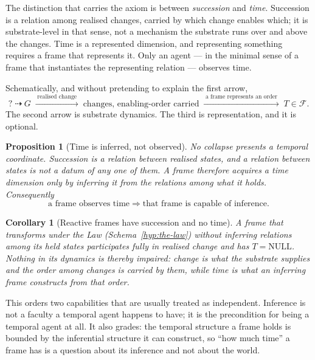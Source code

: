 \documentclass[11pt,a4paper]{article}
\newtheorem{proposition}[definition]{Proposition}
\newtheorem{corollary}[definition]{Corollary}
\theoremstyle{remark}\newtheorem{remark}[definition]{Remark}
\begin{document}
The distinction that carries the axiom is between \emph{succession} and \emph{time}. Succession is a relation among realised changes, carried by which change enables which; it is substrate-level in that sense, not a mechanism the substrate runs over and above the changes. Time is a represented dimension, and representing something requires a frame that represents it. Only an agent --- in the minimal sense of a frame that instantiates the representing relation --- observes time.

Schematically, and without pretending to explain the first arrow,
\[
?\;\dashrightarrow\;G
\;\xrightarrow{\;\text{realised change}\;}\;
\text{changes, enabling-order carried}
\;\xrightarrow{\;\text{a frame represents an order}\;}\;
T\in\mathcal F .
\]
The second arrow is substrate dynamics. The third is representation, and it is optional.

\begin{proposition}[Time is inferred, not observed]\label{prop:time-inferred}
No collapse presents a temporal coordinate. Succession is a relation \emph{between} realised states, and a relation between states is not a datum of any one of them. A frame therefore acquires a time dimension only by \emph{inferring} it from the relations among what it holds. Consequently
\[
\boxed{\text{a frame observes time}\;\Longrightarrow\;\text{that frame is capable of inference.}}
\]
\end{proposition}

\begin{corollary}[Reactive frames have succession and no time]\label{cor:reactive}
A frame that transforms under the Law (Schema~\ref{hyp:the-law}) without inferring relations among its held states participates fully in realised change and has $T=\mathrm{NULL}$. Nothing in its dynamics is thereby impaired: change is what the substrate supplies and the order among changes is carried by them, while time is what an inferring frame constructs from that order.
\end{corollary}
This orders two capabilities that are usually treated as independent. Inference is not a faculty a temporal agent happens to have; it is the precondition for being a temporal agent at all. It also grades: the temporal structure a frame holds is bounded by the inferential structure it can construct, so ``how much time'' a frame has is a question about its inference and not about the world.
\end{document}

